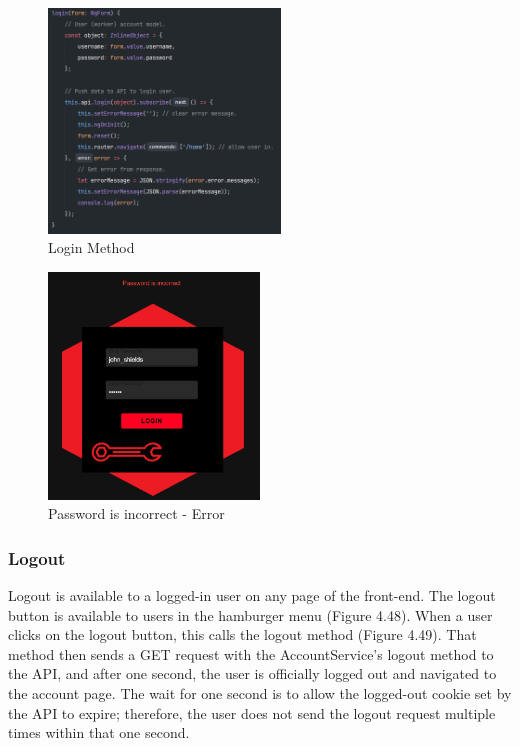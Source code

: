 \begin{figure}[H]
    \caption{Login Method}
    \label{image:loginMethod}
    \centering
    \includegraphics[width=0.55\textwidth]{images/repota/account_pages/login.png}
\end{figure}

\begin{figure}[H]
    \caption{Password is incorrect - Error}
    \label{image:failedLogin}
    \centering
    \includegraphics[width=0.5\textwidth]{images/repota/UI/failed-login.png}
\end{figure}

\subsubsection{Logout}
Logout is available to a logged-in user on any page of the front-end. The logout button is available to users in the hamburger menu (Figure 4.48). When a user clicks on the logout button, this calls the logout method (Figure 4.49). That method then sends a GET request with the AccountService's logout method to the API, and after one second, the user is officially logged out and navigated to the account page. The wait for one second is to allow the logged-out cookie set by the API to expire; therefore, the user does not send the logout request multiple times within that one second.

